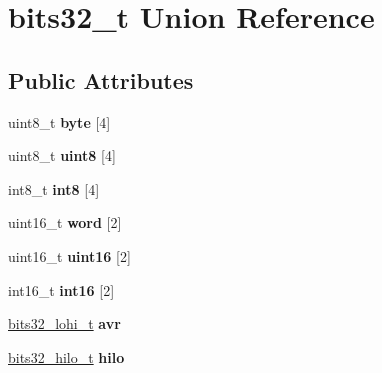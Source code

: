 \hypertarget{unionbits32__t}{}\section{bits32\+\_\+t Union Reference}
\label{unionbits32__t}
\subsection*{Public Attributes}
\begin{DoxyCompactItemize}
\item 
uint8\+\_\+t {\bfseries byte} \mbox{[}4\mbox{]}\hypertarget{unionbits32__t_abe0797e0eb5f1bf589b9c038a78bfbdc}{}\label{unionbits32__t_abe0797e0eb5f1bf589b9c038a78bfbdc}

\item 
uint8\+\_\+t {\bfseries uint8} \mbox{[}4\mbox{]}\hypertarget{unionbits32__t_ade6279a4e44ee0b5ea958f63dbf4388d}{}\label{unionbits32__t_ade6279a4e44ee0b5ea958f63dbf4388d}

\item 
int8\+\_\+t {\bfseries int8} \mbox{[}4\mbox{]}\hypertarget{unionbits32__t_ac3774810575fe4c355270f7292df3035}{}\label{unionbits32__t_ac3774810575fe4c355270f7292df3035}

\item 
uint16\+\_\+t {\bfseries word} \mbox{[}2\mbox{]}\hypertarget{unionbits32__t_a6463efc291982c8a0a0e5fddc4dae8d8}{}\label{unionbits32__t_a6463efc291982c8a0a0e5fddc4dae8d8}

\item 
uint16\+\_\+t {\bfseries uint16} \mbox{[}2\mbox{]}\hypertarget{unionbits32__t_a9b517f749570fa0505ecb07a59d7de04}{}\label{unionbits32__t_a9b517f749570fa0505ecb07a59d7de04}

\item 
int16\+\_\+t {\bfseries int16} \mbox{[}2\mbox{]}\hypertarget{unionbits32__t_afdc70028d0a79d25b72b5674aa9123dd}{}\label{unionbits32__t_afdc70028d0a79d25b72b5674aa9123dd}

\item 
\hyperlink{structbits32__lohi__s}{bits32\+\_\+lohi\+\_\+t} {\bfseries avr}\hypertarget{unionbits32__t_ab3f205911435f4da69f077493a814cb4}{}\label{unionbits32__t_ab3f205911435f4da69f077493a814cb4}

\item 
\hyperlink{structbits32__hilo__s}{bits32\+\_\+hilo\+\_\+t} {\bfseries hilo}\hypertarget{unionbits32__t_acb8df3f2372a628f21d4ba07e471ac15}{}\label{unionbits32__t_acb8df3f2372a628f21d4ba07e471ac15}


\end{DoxyCompactItemize}
